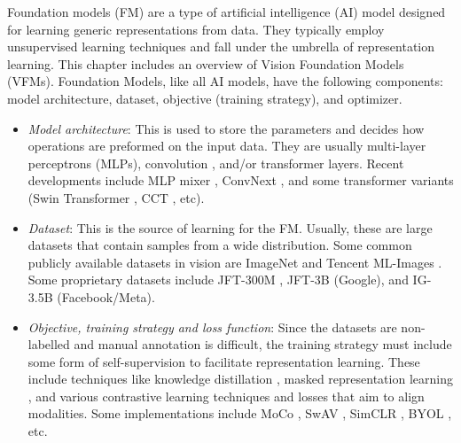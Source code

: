 
Foundation models (FM) are a type of artificial intelligence (AI)
model designed for learning generic representations from data. They
typically employ unsupervised learning techniques and fall under the
umbrella of representation learning. This chapter includes an overview
of Vision Foundation Models (VFMs). Foundation Models, like all AI
models, have the following components: model architecture, dataset,
objective (training strategy), and optimizer.

\begin{itemize}
    \item \emph{Model architecture}: This is used to store the
        parameters and decides how operations are preformed on the
        input data. They are usually multi-layer perceptrons (MLPs),
        convolution \cite{LeCun1998GradientbasedLA}, and/or
        transformer \cite{Dosovitskiy2020AnII, Vaswani2017AttentionIA}
        layers. Recent developments include MLP mixer
        \cite{Tolstikhin2021MLPMixerAA}, ConvNext \cite{Liu2022ACF},
        and some transformer variants (Swin Transformer
        \cite{Liu2021SwinTV, Liu2021SwinTH}, CCT
        \cite{Hassani2021EscapingTB}, etc). 
    \item \emph{Dataset}: This is the source of learning for the FM.
        Usually, these are large datasets that contain samples from a
        wide distribution. Some common publicly available datasets in
        vision are ImageNet \cite{Deng2009ImageNetAL} and Tencent
        ML-Images \cite{Wu2019TencentMA}. Some proprietary datasets
        include JFT-300M \cite{Sun2017RevisitingUE}, JFT-3B
        \cite{Zhai2021ScalingVT} (Google), and IG-3.5B
        \cite{Mahajan2018ExploringTL} (Facebook/Meta).
    \item \emph{Objective, training strategy and loss function}: Since
        the datasets are non-labelled and manual annotation is
        difficult, the training strategy must include some form of
        self-supervision to facilitate representation learning. These
        include techniques like knowledge distillation
        \cite{Hinton2015DistillingTK}, masked representation learning
        \cite{He2021MaskedAA}, and various contrastive learning
        techniques and losses that aim to align modalities. Some
        implementations include MoCo \cite{He2019MomentumCF,
        Chen2020ImprovedBW}, SwAV \cite{Caron2020UnsupervisedLO},
        SimCLR \cite{Chen2020ASF, Chen2020BigSM}, BYOL
        \cite{Grill2020BootstrapYO}, etc.

\end{itemize}
